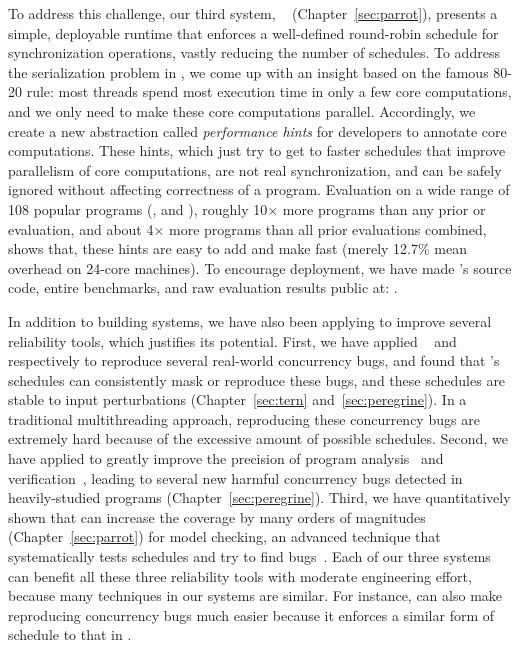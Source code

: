 To address this challenge, our third \smt system, 
\parrot~\cite{parrot:sosp13}
(Chapter~\ref{sec:parrot}), presents a simple, deployable runtime that enforces
a well-defined round-robin schedule for synchronization operations, vastly
reducing the number of schedules. To address the serialization problem in \smt,
we come up with an insight based on the famous 80-20 rule: most threads spend
most execution time in only a few core computations, and we only need to make 
these core computations parallel. Accordingly, we create a new abstraction
called \emph{performance hints} for developers to annotate core computations.
These hints, which just try to get to faster schedules that improve parallelism
of core computations, are not real synchronization, and can be safely ignored
without affecting correctness of a program. Evaluation on a wide range of 108
popular programs (\eg, \bdb and \mplayer), roughly 10$\times$ more programs than
any prior \smt or \dmt evaluation, and about 4$\times$ more programs than all
prior evaluations combined, shows that, these hints are easy to add and make
\parrot fast (merely 12.7\% mean overhead on 24-core machines). To encourage 
\smt deployment, we have made \parrot's source code, entire benchmarks, and raw
evaluation results public at: \github.

In addition to building \smt systems, we have also been applying \smt to 
improve several reliability tools, which justifies its potential. First, we 
have applied \tern~\cite{cui:tern:osdi10} and 
\peregrine~\cite{peregrine:sosp11} respectively to reproduce several real-world 
concurrency bugs, and found that \smt's schedules can consistently mask or 
reproduce these bugs, and these schedules are stable to input perturbations 
(Chapter~\ref{sec:tern} and~\ref{sec:peregrine}). In a traditional 
multithreading approach, reproducing these concurrency bugs are 
extremely hard because of the excessive amount of possible schedules. Second, 
we have applied \peregrine to greatly improve the precision of program 
analysis~\cite{wu:pldi12} and verification~\cite{wu:pldi12}, leading to several 
new harmful concurrency bugs detected in heavily-studied programs 
(Chapter~\ref{sec:peregrine}). Third, we have quantitatively shown that \parrot 
can increase the coverage by many orders of magnitudes 
(Chapter~\ref{sec:parrot}) for model checking, an advanced technique that 
systematically tests schedules and try to find bugs~\cite{parrot:sosp13, 
dbug:spin11, modist:nsdi09}. Each of our three \smt systems can benefit all 
these three reliability tools with moderate engineering effort, because many 
techniques in our \smt systems are similar. For instance, \parrot can also make 
reproducing concurrency bugs much easier because it enforces a similar form of 
schedule to that in \tern.

